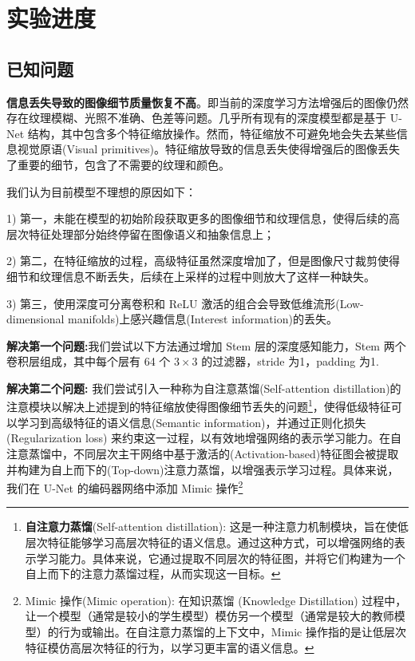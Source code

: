 \documentclass[a4paper]{ctexart}
\begin{document}
	\section{实验进度}
		
		\subsection*{已知问题}
		
		\textbf{信息丢失导致的图像细节质量恢复不高}\cite{zhang2023frc}。即当前的深度学习方法增强后的图像仍然存在纹理模糊、光照不准确、色差等问题。几乎所有现有的深度模型都是基于 U-Net 结构，其中包含多个特征缩放操作\cite{ronneberger2015u}。然而，特征缩放不可避免地会失去某些信息视觉原语(Visual primitives)\cite{zhang2021accurate}。特征缩放导致的信息丢失使得增强后的图像丢失了重要的细节，包含了不需要的纹理和颜色。
		
		我们认为目前模型不理想的原因如下：
		
		1) 第一，未能在模型的初始阶段获取更多的图像细节和纹理信息，使得后续的高层次特征处理部分始终停留在图像语义和抽象信息上；
		
		2) 第二，在特征缩放的过程，高级特征虽然深度增加了，但是图像尺寸裁剪使得细节和纹理信息不断丢失，后续在上采样的过程中则放大了这样一种缺失。
		
		3) 第三，使用深度可分离卷积和 ReLU 激活的组合会导致低维流形(Low-dimensional manifolds)上感兴趣信息(Interest information)的丢失\cite{sandler2018mobilenetv2}。
		 
		\textbf{解决第一个问题:}我们尝试以下方法通过增加 Stem 层的深度感知能力，Stem 两个卷积层组成，其中每个层有 64 个 $3 \times 3$ 的过滤器，stride 为1，padding 为1.
		
		\textbf{解决第二个问题:}
		我们尝试引入一种称为自注意蒸馏(Self-attention distillation)的注意模块\cite{guo2019pipeline}以解决上述提到的特征缩放使得图像细节丢失的问题\footnote{\textbf{自注意力蒸馏}(Self-attention distillation): 这是一种注意力机制模块，旨在使低层次特征能够学习高层次特征的语义信息。通过这种方式，可以增强网络的表示学习能力。具体来说，它通过提取不同层次的特征图，并将它们构建为一个自上而下的注意力蒸馏过程，从而实现这一目标。}，使得低级特征可以学习到高级特征的语义信息(Semantic information)，并通过正则化损失 (Regularization loss) 来约束这一过程，以有效地增强网络的表示学习能力。在自注意蒸馏中，不同层次主干网络中基于激活的(Activation-based)特征图会被提取并构建为自上而下的(Top-down)注意力蒸馏，以增强表示学习过程。具体来说，我们在 U-Net 的编码器网络中添加 Mimic 操作\footnote{Mimic 操作(Mimic operation): 在知识蒸馏 (Knowledge Distillation) 过程中，让一个模型（通常是较小的学生模型）模仿另一个模型（通常是较大的教师模型）的行为或输出。在自注意力蒸馏的上下文中，Mimic 操作指的是让低层次特征模仿高层次特征的行为，以学习更丰富的语义信息。}
		
\end{document}
